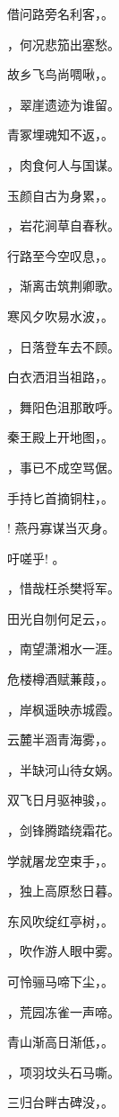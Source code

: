\documentclass[12pt, a4paper, addpoints, answers]{exam}
\begin{document}
\begin{questions}
\question[3] 借问路旁名利客，\fillin。

\question[3] \fillin，何况悲笳出塞愁。

\question[3] 故乡飞鸟尚啁啾，\fillin。

\question[3] \fillin，翠崖遗迹为谁留。

\question[3] 青冢埋魂知不返，\fillin。

\question[3] \fillin，肉食何人与国谋。

\question[3] 玉颜自古为身累，\fillin。

\question[3] \fillin，岩花涧草自春秋。

\question[3] 行路至今空叹息，\fillin。

\question[3] \fillin，渐离击筑荆卿歌。

\question[3] 寒风夕吹易水波，\fillin。

\question[3] \fillin，日落登车去不顾。

\question[3] 白衣洒泪当祖路，\fillin。

\question[3] \fillin，舞阳色沮那敢呼。

\question[3] 秦王殿上开地图，\fillin。

\question[3] \fillin，事已不成空骂倨。

\question[3] 手持匕首摘铜柱，\fillin。

\question[3] \fillin! 燕丹寡谋当灭身。

\question[3] 吁嗟乎! \fillin。

\question[3] \fillin，惜哉枉杀樊将军。

\question[3] 田光自刎何足云，\fillin。

\question[3] \fillin，南望潇湘水一涯。

\question[3] 危楼樽酒赋蒹葭，\fillin。

\question[3] \fillin，岸枫遥映赤城霞。

\question[3] 云麓半涵青海雾，\fillin。

\question[3] \fillin，半缺河山待女娲。

\question[3] 双飞日月驱神骏，\fillin。

\question[3] \fillin，剑锋腾踏绕霜花。

\question[3] 学就屠龙空束手，\fillin。

\question[3] \fillin，独上高原愁日暮。

\question[3] 东风吹绽红亭树，\fillin。

\question[3] \fillin，吹作游人眼中雾。

\question[3] 可怜骊马啼下尘，\fillin。

\question[3] \fillin，荒园冻雀一声啼。

\question[3] 青山渐高日渐低，\fillin。

\question[3] \fillin，项羽坟头石马嘶。

\question[3] 三归台畔古碑没，\fillin。

\end{questions}
\end{document}
